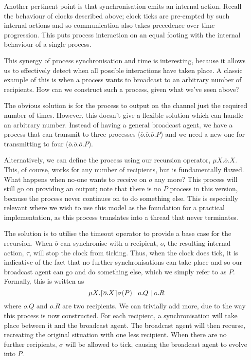 \documentclass{acm_proc_article-sp}
\begin{document}
Another pertinent point is that synchronisation emits an internal
action.  Recall the behaviour of clocks described above; clock ticks are
pre-empted by such internal actions and so communication also takes
precedence over time progression.  This puts process interaction on an
equal footing with the internal behaviour of a single process.

This synergy of process synchronisation and time is interesting, because
it allows us to effectively detect when all possible interactions have
taken place.  A classic example of this is when a process wants to
broadcast to an arbitrary number of recipients.  How can we construct
such a process, given what we've seen above?

The obvious solution is for the process to output on the channel just
the required number of times.  However, this doesn't give a flexible
solution which can handle an arbitrary number.  Instead of having a
general broadcast agent, we have a process that can transmit to three
processes ($\overline{o}.\overline{o}.\overline{o}.P$) and we need a new
one for transmitting to four
($\overline{o}.\overline{o}.\overline{o}.P$).

Alternatively, we can define the process using our recursion operator,
$\mu X.\overline{o}.X$.  This, of course, works for any number of
recipients, but is fundamentally flawed.  What happens when no-one wants
to receive on $o$ any more?  This process will still go on providing an
output; note that there is no $P$ process in this version, because the
process never continues on to do something else.  This is especially
relevant where we wish to use this model as the foundation for a
practical implementation, as this process translates into a thread that
never terminates.

The solution is to utilise the timeout operator to provide a base case
for the recursion.  When $\overline{o}$ can synchronise with a
recipient, $o$, the resulting internal action, $\tau$, will stop the
clock from ticking.  Thus, when the clock does tick, it is indicative of
the fact that no further synchronisations can take place and so our
broadcast agent can go and do something else, which we simply refer to
as $P$.  Formally, this is written as
\begin{displaymath} 
\mu X.\lceil{\overline{o}.X}\rceil {\sigma} ({P}) \mid o.Q \mid o.R
\end{displaymath}
where $o.Q$ and $o.R$ are two recipients.  We can trivially add more,
due to the way this process is now constructed.  For each recipient, a
synchronisation will take place between it and the broadcast agent.  The
broadcast agent will then recurse, recreating the original situation
with one less recipient.  When there are no further recipients, $\sigma$
will be allowed to tick, causing the broadcast agent to evolve into $P$.
\end{document}
